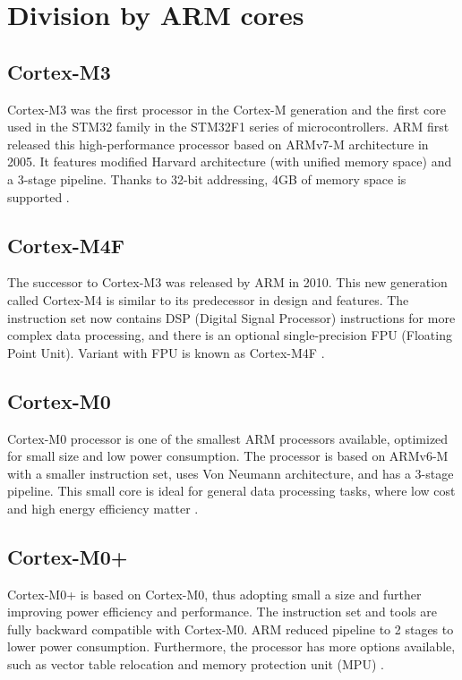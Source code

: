 \section{Division by ARM cores}
\label{sec:stm_arm_division}
	\subsection{Cortex-M3}
	\label{sub:stm_m3}
Cortex-M3 was the first processor in the Cortex-M generation and the first core used in the STM32 family in the STM32F1 series of microcontrollers. ARM first released this high-performance processor based on ARMv7-M architecture in 2005. It features modified Harvard architecture (with unified memory space) and a 3-stage pipeline. Thanks to 32-bit addressing, 4GB of memory space is supported \cite{yu}.
	
	\subsection{Cortex-M4F}
	\label{sub:stm_m4}
The successor to Cortex-M3 was released by ARM in 2010. This new generation called Cortex-M4 is similar to its predecessor in design and features. The instruction set now contains DSP (Digital Signal Processor) instructions for more complex data processing, and there is an optional single-precision FPU (Floating Point Unit). Variant with FPU is known as Cortex-M4F \cite{yu}. 
	
	\subsection{Cortex-M0}
	\label{sub:stm_m0}
Cortex-M0 processor is one of the smallest ARM processors available, optimized for small size and low power consumption. The processor is based on ARMv6-M with a smaller instruction set, uses Von Neumann architecture, and has a 3-stage pipeline. This small core is ideal for general data processing tasks, where low cost and high energy efficiency matter \cite{m0_web}.
	
	\subsection{Cortex-M0+}
	\label{sub:stm_m0_plus}
Cortex-M0+ is based on Cortex-M0, thus adopting small a size and further improving power efficiency and performance. The instruction set and tools are fully backward compatible with Cortex-M0. ARM reduced pipeline to 2 stages to lower power consumption. Furthermore, the processor has more options available, such as vector table relocation and memory protection unit (MPU) \cite{m0+_web}.
	
